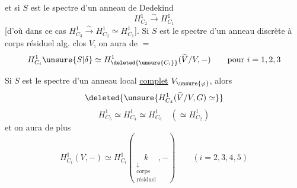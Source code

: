 et si $S$ est le spectre d'un anneau de Dedekind
\[
H^1_{C_2}\xrightarrow{\sim}H^1_{C_1}
\]
[d'où dans ce cas $H^1_{C_3}\xrightarrow{\sim}H^1_{C_2}\simeq H^1_{C_1}$].
Si $S$ est le spectre d'un anneau   discrète à corps résiduel alg. clos $V$, on aura de $=$
\[
H^1_{C_i}\unsure{S|\delta}\simeq H^1_{\deleted{\unsure{C_i}}}(\widehat V/V,-)
\qquad\text{pour }i=1,2,3
\]

Si $S$ est le spectre d'un anneau local \uline{complet} $V_{\unsure{\varphi}}$, alors
\[
\deleted{\unsure{H^1_{C_4}(\widehat V/V,G)\simeq}}
\]
\[
H^1_{C_5}\simeq H^1_{C_4}\simeq H^1_{C_3}\quad(\simeq H^1_{C_2})
\]
et on aura de plus
\[
H^1_{C_i}(V,-)\simeq H^1_{C_i}
(\underset{\substack{\downarrow\\\text{corps}\\\text{résiduel}}}{k},-)
\qquad(i=2,3,4,5)
\]
